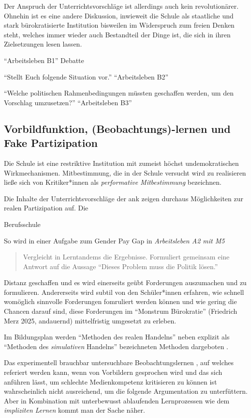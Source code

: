 Der Anspruch der Unterrichtsvorschläge ist allerdings auch kein revolutionärer. Ohnehin ist es eine andere Diskussion, inwieweit die Schule als staatliche und stark bürokratisierte Institution bisweilen im Widerspruch zum freien Denken steht, welches immer wieder auch Bestandteil der Dinge ist, die sich in ihren Zielsetzungen lesen lassen. 

\enquote{Arbeitsleben B1} Debatte

\enquote{Stellt Euch folgende Situation vor.} \enquote{Arbeitsleben B2}

\enquote{Welche politischen Rahmenbedingungen müssten geschaffen werden, um den Vorschlag umzusetzen?} \enquote{Arbeitsleben B3}

\subsection{Vorbildfunktion, (Beobachtungs)-lernen und Fake Partizipation \label{fakePartizipation}}
Die Schule ist eine restriktive Institution mit zumeist höchst undemokratischen Wirkmechanismen.
Mitbestimmung, die in der Schule versucht wird zu realisieren ließe sich von Kritiker*innen als \emph{performative Mitbestimmung} bezeichnen. 


Die Inhalte der Unterrichtsvorschläge der \gls{ank} zeigen durchaus Möglichkeiten zur realen Partizipation auf. Die  

Berufsschule 

So wird in einer Aufgabe zum Gender Pay Gap in \emph{Arbeitsleben A2 mit M5}

\begin{quote}
    Vergleicht in Lerntandems die Ergebnisse. Formuliert gemeinsam eine Antwort auf die Aussage \enquote{Dieses Problem muss die Politik lösen.}
\end{quote}

Distanz geschaffen und es wird einerseits geübt Forderungen auszumachen und zu formulieren. Andererseits wird subtil von den Schüler*innen erfahren, wie schnell womöglich sinnvolle Forderungen fomruliert werden können und wie gering die Chancen darauf sind, diese Forderungen im \enquote{Monstrum Bürokratie} (Friedrich Merz 2025, andauernd) mittelfristig umgesetzt zu erleben. 

Im Bildungsplan werden \enquote{Methoden des realen Handelns} \autocite[13]{bplan} neben explizit als \enquote{Methoden des \emph{simulativen} Handelns} bezeichneten Methoden dargeboten \autocite[14]{bplan}.

Das experimentell brauchbar untersuchbare Beobachtungslernen \autocite{Bandura.1977}, auf welches referiert werden kann, wenn von Vorbildern gesprochen wird und das sich anführen lässt, um schlechte Medienkompetenz kritisieren zu können ist wahrscheinlich nicht ausreichend, um die folgende Argumentation zu unterfüttern.
Aber in Kombination mit unterbewusst ablaufenden Lernprozessen wie dem \emph{impliziten Lernen} \autocite[82-93]{Kiesel2012} kommt man der Sache näher.


